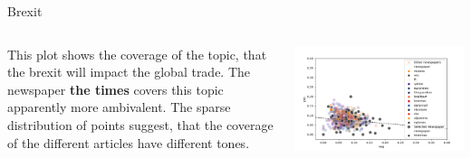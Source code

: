 \documentclass[final]{beamer}
\newlength{\twocolwid}
\begin{document}
\begin{frame}[t]
\begin{columns}[t]
\begin{column}{\twocolwid}
\begin{block}{Brexit {}}
    \begin{columns}[onlytextwidth]
        \begin{column}{.55\textwidth}
            This plot shows the coverage of the topic, that the brexit will impact the global trade. The newspaper \textbf{the times} covers this topic apparently more ambivalent. The sparse distribution of points suggest, that the coverage of the different articles have different tones.
        \end{column}
        \begin{column}{.45\textwidth}
            \includegraphics[width=0.8\linewidth]{poster/brexit_5_thetimes.png} 
        \end{column}
    \end{columns}

\end{block}



\end{column}
\end{columns}
\end{frame}
\end{document}
